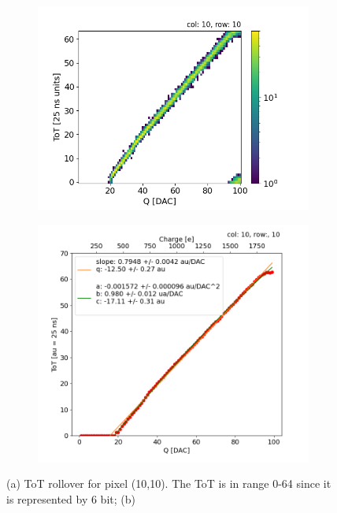         \begin{figure}[h!]
            \begin{subfigure}{.5\textwidth}
            \centering
            \includegraphics[width=.98\linewidth]{figures/charaterization/ToT_rollover.png}
            \end{subfigure}
            \begin{subfigure}{.5\textwidth}
            \centering
            \includegraphics[width=.98\linewidth]{figures/charaterization/ToT_injection.png}
            \end{subfigure}
            \label{fig:ToT_vs_charge}
            \caption{(a) ToT rollover for pixel (10,10). The ToT is in range 0-64 since it is represented by 6 bit; (b)}
        \end{figure}    

